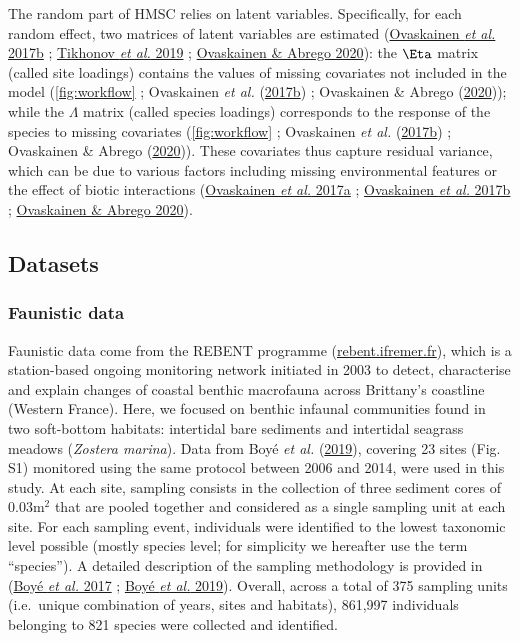 \documentclass[9pt,biorxiv,doublespacing,lineno]{lapreprint}
\begin{document}
The random part of HMSC relies on latent variables. Specifically, for
each random effect, two matrices of latent variables are estimated
(\protect\hyperlink{ref-Ovaskainen_2017a}{Ovaskainen \emph{et al.}
2017b} ; \protect\hyperlink{ref-Tikhonov_2019b}{Tikhonov \emph{et al.}
2019} ; \protect\hyperlink{ref-Ovaskainen_2020}{Ovaskainen \& Abrego
2020}): the \(\Eta\) matrix (called site loadings) contains the values
of missing covariates not included in the model (\cref{fig:workflow} ;
Ovaskainen \emph{et al.}
(\protect\hyperlink{ref-Ovaskainen_2017a}{2017b}) ; Ovaskainen \& Abrego
(\protect\hyperlink{ref-Ovaskainen_2020}{2020})); while the \(\Lambda\)
matrix (called species loadings) corresponds to the response of the
species to missing covariates (\cref{fig:workflow} ; Ovaskainen \emph{et
al.} (\protect\hyperlink{ref-Ovaskainen_2017a}{2017b}) ; Ovaskainen \&
Abrego (\protect\hyperlink{ref-Ovaskainen_2020}{2020})). These
covariates thus capture residual variance, which can be due to various
factors including missing environmental features or the effect of biotic
interactions (\protect\hyperlink{ref-Ovaskainen_2017b}{Ovaskainen
\emph{et al.} 2017a} ;
\protect\hyperlink{ref-Ovaskainen_2017a}{Ovaskainen \emph{et al.} 2017b}
; \protect\hyperlink{ref-Ovaskainen_2020}{Ovaskainen \& Abrego 2020}).

\hypertarget{datasets}{%
\subsection{Datasets}\label{datasets}}

\hypertarget{faunistic-data}{%
\subsubsection{Faunistic data}\label{faunistic-data}}

Faunistic data come from the REBENT programme
(\href{https://rebent.ifremer.fr}{rebent.ifremer.fr}), which is a
station-based ongoing monitoring network initiated in 2003 to detect,
characterise and explain changes of coastal benthic macrofauna across
Brittany's coastline (Western France). Here, we focused on benthic
infaunal communities found in two soft-bottom habitats: intertidal bare
sediments and intertidal seagrass meadows (\emph{Zostera marina}). Data
from Boyé \emph{et al.} (\protect\hyperlink{ref-Boye_2019a}{2019}),
covering 23 sites (Fig. S1) monitored using the same protocol between
2006 and 2014, were used in this study. At each site, sampling consists
in the collection of three sediment cores of 0.03m\(^2\) that are pooled
together and considered as a single sampling unit at each site. For each
sampling event, individuals were identified to the lowest taxonomic
level possible (mostly species level; for simplicity we hereafter use
the term ``species''). A detailed description of the sampling
methodology is provided in (\protect\hyperlink{ref-Boye_2017}{Boyé
\emph{et al.} 2017} ; \protect\hyperlink{ref-Boye_2019a}{Boyé \emph{et
al.} 2019}). Overall, across a total of 375 sampling units (i.e.~unique
combination of years, sites and habitats), 861,997 individuals belonging
to 821 species were collected and identified.
\end{document}
